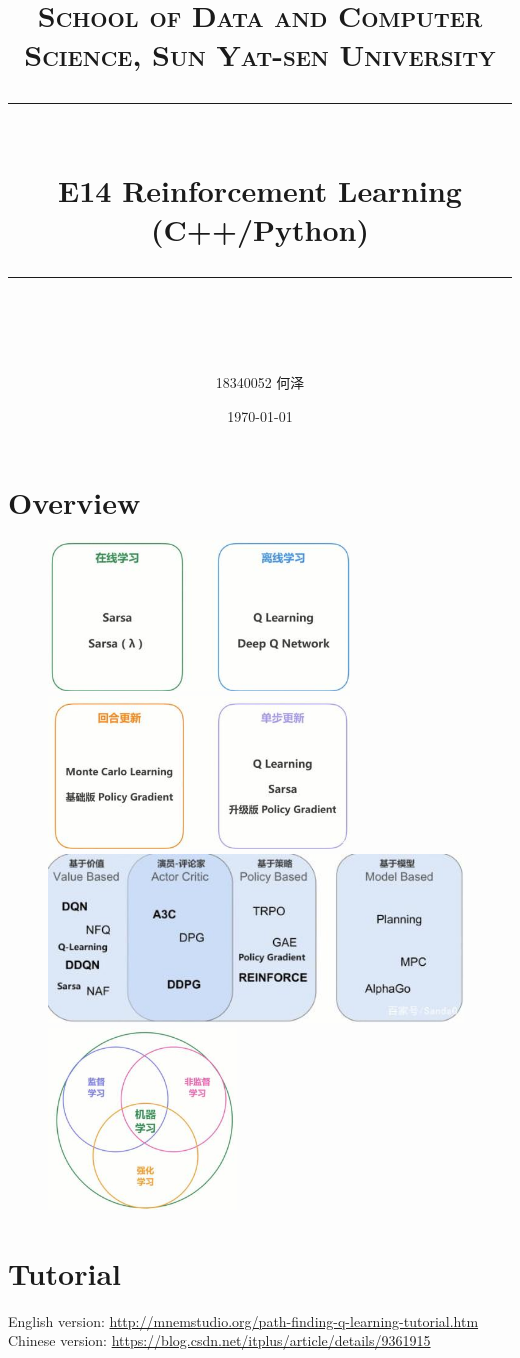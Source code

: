 \documentclass[a4paper, 11pt]{article}
\title{	
\normalfont \normalsize
\textsc{School of Data and Computer Science, Sun Yat-sen University} \\ [25pt] %
\rule{\textwidth}{0.5pt} \\[0.4cm] %
\huge  E14 Reinforcement Learning (C++/Python)\\ %
\rule{\textwidth}{2pt} \\[0.5cm] %
\author{18340052  何泽}
\date{\normalsize\today}
}
\begin{document}
\maketitle
\tableofcontents
\newpage
\section{Overview}
\begin{figure}[ht]
\centering
\includegraphics[width=8cm]{Pic/on_off}
\quad
\includegraphics[width=8cm]{Pic/update}
\includegraphics[width=11cm]{Pic/base}
\quad
\includegraphics[width=5cm]{Pic/relation}
\end{figure}
\section{Tutorial}
English version: \url{http://mnemstudio.org/path-finding-q-learning-tutorial.htm}\\
Chinese version: \url{https://blog.csdn.net/itplus/article/details/9361915}
\end{document}

